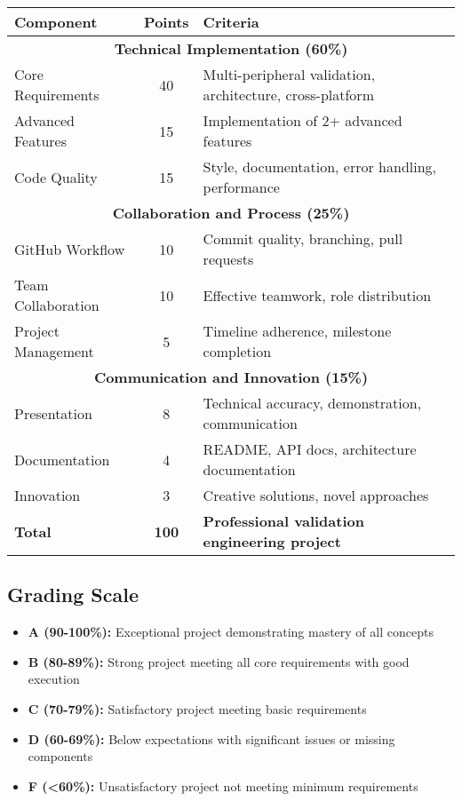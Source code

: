 \documentclass[11pt,a4paper]{article}
\begin{document}
\begin{center}
\begin{tabular}{|l|c|l|}
\hline
\textbf{Component} & \textbf{Points} & \textbf{Criteria} \\
\hline
\multicolumn{3}{|c|}{\textbf{Technical Implementation (60\%)}} \\
\hline
Core Requirements & 40 & Multi-peripheral validation, architecture, cross-platform \\
Advanced Features & 15 & Implementation of 2+ advanced features \\
Code Quality & 15 & Style, documentation, error handling, performance \\
\hline
\multicolumn{3}{|c|}{\textbf{Collaboration and Process (25\%)}} \\
\hline
GitHub Workflow & 10 & Commit quality, branching, pull requests \\
Team Collaboration & 10 & Effective teamwork, role distribution \\
Project Management & 5 & Timeline adherence, milestone completion \\
\hline
\multicolumn{3}{|c|}{\textbf{Communication and Innovation (15\%)}} \\
\hline
Presentation & 8 & Technical accuracy, demonstration, communication \\
Documentation & 4 & README, API docs, architecture documentation \\
Innovation & 3 & Creative solutions, novel approaches \\
\hline
\textbf{Total} & \textbf{100} & \textbf{Professional validation engineering project} \\
\hline
\end{tabular}
\end{center}

\subsection{Grading Scale}
\begin{itemize}
    \item \textbf{A (90-100\%):} Exceptional project demonstrating mastery of all concepts
    \item \textbf{B (80-89\%):} Strong project meeting all core requirements with good execution
    \item \textbf{C (70-79\%):} Satisfactory project meeting basic requirements
    \item \textbf{D (60-69\%):} Below expectations with significant issues or missing components
    \item \textbf{F (<60\%):} Unsatisfactory project not meeting minimum requirements
\end{itemize}
\end{document}
